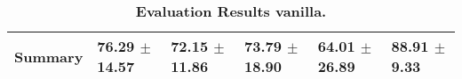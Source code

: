 \begin{table}[htb]
{\begin{tabular}{llllll}
\midrule
\textbf{Summary                                  } &                  \phantom{0}76.29 $\pm$ 14.57 &                      \phantom{0}72.15 $\pm$ 11.86 &                  \phantom{0}73.79 $\pm$ 18.90 &                  \phantom{0}64.01 $\pm$ 26.89 &  \phantom{0}88.91 $\pm$ \phantom{0}9.33 \\
\bottomrule
\end{tabular}%
}
\caption{\textbf{Evaluation Results vanilla.}}
\label{tab:eval-results}
\end{table}



